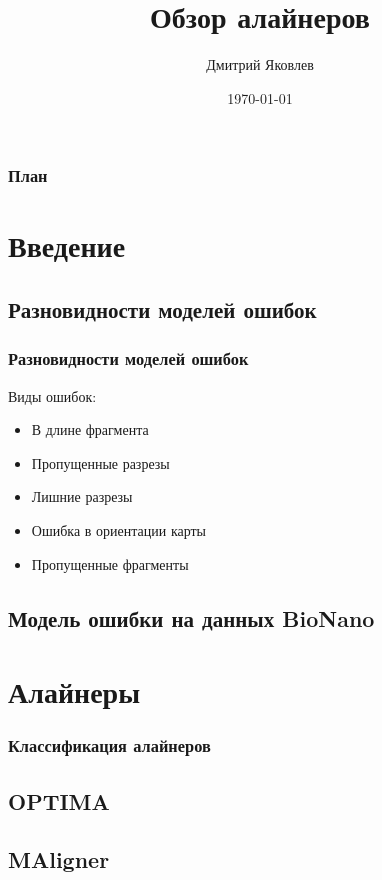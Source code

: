 \documentclass{beamer}
\title[Обзор алайнеров]{Обзор алайнеров}
\author{Дмитрий Яковлев}
\institute{EPAM Systems}
\date{\today}
\begin{document}
\graphicspath{{./img/}}

\begin{frame}
  \titlepage
\end{frame}

\begin{frame}
\frametitle{План}
\tableofcontents
\end{frame}

\section{Введение}


\subsection{Разновидности моделей ошибок}

\begin{frame}
\frametitle{Разновидности моделей ошибок}
Виды ошибок:
\begin{itemize}
  \item В длине фрагмента
  \item Пропущенные разрезы
  \item Лишние разрезы
  \item Ошибка в ориентации карты
  \item Пропущенные фрагменты
\end{itemize}

\end{frame}

\subsection{Модель ошибки на данных BioNano}


\section{Алайнеры}

\begin{frame}
\frametitle{Классификация алайнеров}

\end{frame}

\subsection{OPTIMA}


\subsection{MAligner}

\end{document}
